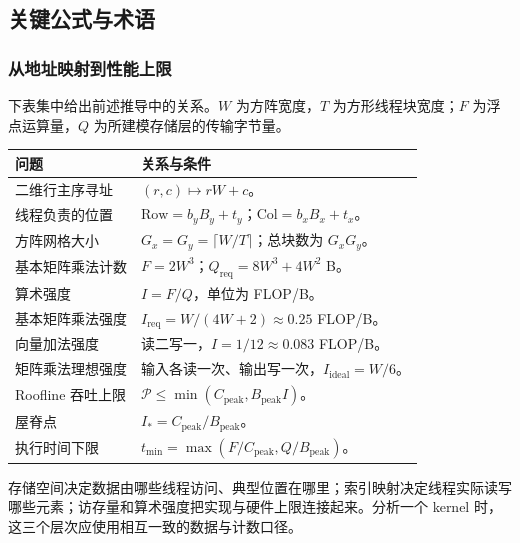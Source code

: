 \subsection{关键公式与术语}

\subsubsection{从地址映射到性能上限}
下表集中给出前述推导中的关系。$W$ 为方阵宽度，$T$ 为方形线程块宽度；$F$ 为浮点运算量，$Q$ 为所建模存储层的传输字节量。
\begin{table}[H]
\centering\small
\begin{tabularx}{\textwidth}{L{0.24\textwidth} Y}
\toprule
问题 & 关系与条件 \\
\midrule
二维行主序寻址 & $(r,c)\mapsto rW+c$。 \\
线程负责的位置 & $\mathrm{Row}=b_yB_y+t_y$；$\mathrm{Col}=b_xB_x+t_x$。 \\
方阵网格大小 & $G_x=G_y=\lceil W/T\rceil$；总块数为 $G_xG_y$。 \\
基本矩阵乘法计数 & $F=2W^3$；$Q_{\mathrm{req}}=8W^3+4W^2$ B。 \\
算术强度 & $I=F/Q$，单位为 FLOP/B。 \\
基本矩阵乘法强度 & $I_{\mathrm{req}}=W/(4W+2)\approx0.25$ FLOP/B。 \\
向量加法强度 & 读二写一，$I=1/12\approx0.083$ FLOP/B。 \\
矩阵乘法理想强度 & 输入各读一次、输出写一次，$I_{\mathrm{ideal}}=W/6$。 \\
Roofline 吞吐上限 & $\mathcal P\le\min(C_{\mathrm{peak}},B_{\mathrm{peak}}I)$。 \\
屋脊点 & $I_*=C_{\mathrm{peak}}/B_{\mathrm{peak}}$。 \\
执行时间下限 & $t_{\min}=\max(F/C_{\mathrm{peak}},Q/B_{\mathrm{peak}})$。 \\
\bottomrule
\end{tabularx}
\end{table}
存储空间决定数据由哪些线程访问、典型位置在哪里；索引映射决定线程实际读写哪些元素；访存量和算术强度把实现与硬件上限连接起来。分析一个 kernel 时，这三个层次应使用相互一致的数据与计数口径。

